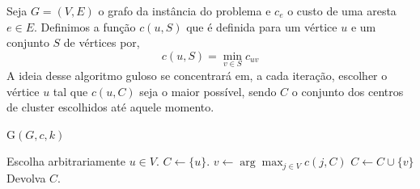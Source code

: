 Seja $G = (V,E)$ o grafo da instância do problema e $c_e$ o custo de uma aresta $e \in E$.
    Definimos a função $c(u,S)$ que é definida para um vértice $u$ e um conjunto $S$ de vértices  por,
    \[ c(u,S) = \min_{v\in S} c_{uv}
        \]
    A ideia desse algoritmo guloso se concentrará em, a cada iteração, escolher o vértice $u$ tal que $c(u,C)$ seja o maior possível, sendo $C$ o conjunto dos centros de cluster escolhidos até aquele momento.

    \begin{algorithm}
		\caption{G$(G,c,k)$}
        \label{k-center:guloso}
        \begin{algorithmic}[1]
			\State Escolha arbitrariamente $u \in V$.
            \State $C \gets \{u\}$.
            \State $v \gets \arg\max_{j \in V} c(j,C)$
            \State $C \gets C \cup \{v\}$
            \EndWhile 
			\State Devolva $C$.
		\end{algorithmic}
	\end{algorithm}
    
